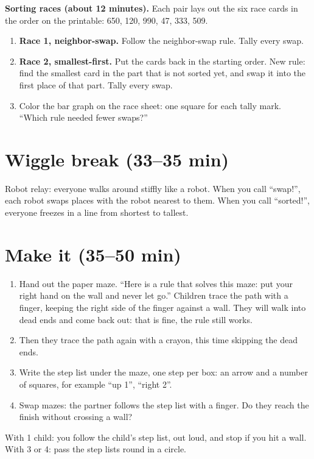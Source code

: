\textbf{Sorting races (about 12 minutes).} Each pair lays out the six race cards in the order on the printable: 650, 120, 990, 47, 333, 509.
\begin{enumerate}[leftmargin=1.4em,itemsep=1pt]
  \item \textbf{Race 1, neighbor-swap.} Follow the neighbor-swap rule. Tally every swap.
  \item \textbf{Race 2, smallest-first.} Put the cards back in the starting order. New rule: find the smallest card in the part that is not sorted yet, and swap it into the first place of that part. Tally every swap.
  \item Color the bar graph on the race sheet: one square for each tally mark. \enquote{Which rule needed fewer swaps?}
\end{enumerate}

\section{Wiggle break (33--35 min)}
Robot relay: everyone walks around stiffly like a robot. When you call \enquote{swap!}, each robot swaps places with the robot nearest to them. When you call \enquote{sorted!}, everyone freezes in a line from shortest to tallest.

\section{Make it (35--50 min)}
\begin{unplugged}
\begin{enumerate}[leftmargin=1.4em,itemsep=1pt]
  \item Hand out the paper maze. \enquote{Here is a rule that solves this maze: put your right hand on the wall and never let go.} Children trace the path with a finger, keeping the right side of the finger against a wall. They will walk into dead ends and come back out: that is fine, the rule still works.
  \item Then they trace the path again with a crayon, this time skipping the dead ends.
  \item Write the step list under the maze, one step per box: an arrow and a number of squares, for example \enquote{up 1}, \enquote{right 2}.
  \item Swap mazes: the partner follows the step list with a finger. Do they reach the finish without crossing a wall?
\end{enumerate}
With 1 child: you follow the child's step list, out loud, and stop if you hit a wall. With 3 or 4: pass the step lists round in a circle.
\end{unplugged}

